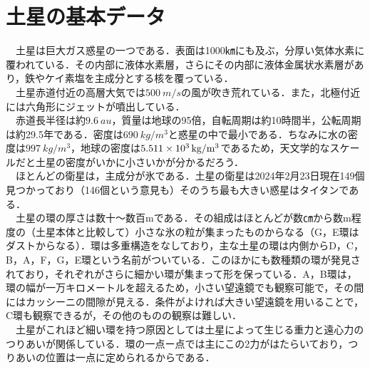 \documentclass[../main]{subfiles}
\begin{document}
\section{土星の基本データ}
　土星は巨大ガス惑星の一つである．表面は1000㎞にも及ぶ，分厚い気体水素に覆われている．その内部に液体水素層，さらにその内部に液体金属状水素層があり，鉄やケイ素塩を主成分とする核を覆っている．\\
　土星赤道付近の高層大気では$\SI[mode=text]{500}{m/s}$の風が吹き荒れている．また，北極付近には六角形にジェットが噴出している．\\
　赤道長半径は約$\SI[mode=text]{9.6}{au}$，質量は地球の95倍，自転周期は約10時間半，公転周期は約29.5年である．密度は$\SI[mode=text]{690}{kg/m^3}$と惑星の中で最小である．ちなみに水の密度は$\SI[mode=text]{997}{kg/m^3}$，地球の密度は$\SI[mode=text]{5.511E3}{kg/m^3}$であるため，天文学的なスケールだと土星の密度がいかに小さいかが分かるだろう．\\
　ほとんどの衛星は，主成分が氷である．土星の衛星は2024年2月23日現在149個見つかっており（146個という意見も）そのうち最も大きい惑星はタイタンである．\\
　土星の環の厚さは数十〜数百mである．その組成はほとんどが数㎝から数m程度の（土星本体と比較して）小さな氷の粒が集まったものからなる（G，E環はダストからなる）．環は多重構造をなしており，主な土星の環は内側からD，C，B，A，F，G，E環という名前がついている．このほかにも数種類の環が発見されており，それぞれがさらに細かい環が集まって形を保っている．A，B環は，環の幅が一万キロメートルを超えるため，小さい望遠鏡でも観察可能で，その間にはカッシーニの間隙が見える．条件がよければ大きい望遠鏡を用いることで，C環も観察できるが，その他のものの観察は難しい．\\
　土星がこれほど細い環を持つ原因としては土星によって生じる重力と遠心力のつりあいが関係している．環の一点ー点では主にこの2力がはたらいており，つりあいの位置は一点に定められるからである．
\end{document}
